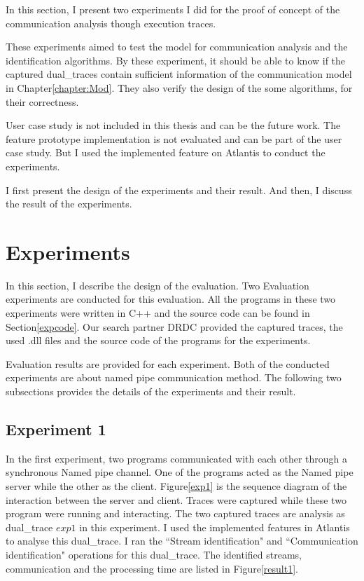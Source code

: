 


\label{chapter:Exp}
In this section, I present two experiments I did for the proof of concept of the communication analysis though execution traces.

These experiments aimed to test the model for communication analysis and the identification algorithms. By these experiment, it should be able to know if the captured dual\_traces contain sufficient information of the communication model in Chapter\ref{chapter:Mod}. They also verify the design of the some algorithms, for their correctness.  

User case study is not included in this thesis and can be the future work. The feature prototype implementation is not evaluated and can be part of the user case study. But I used the implemented feature on Atlantis to conduct the experiments.

I first present the design of the experiments and their result. And then, I discuss the result of the experiments.  

\section{Experiments}
In this section, I describe the design of the evaluation. Two Evaluation experiments are conducted for this evaluation. All the programs in these two experiments were written in C++ and the source code can be found in Section\ref{expcode}. Our search partner DRDC provided the captured traces, the used .dll files and  the source code of the programs for the experiments.

Evaluation results are provided for each experiment. Both of the conducted experiments are about named pipe communication method. The following two subsections provides the details of the experiments and their result.

\subsection{Experiment 1}
In the first experiment, two programs communicated with each other through a synchronous Named pipe channel. One of the programs acted as the Named pipe server while the other as the client. Figure\ref{exp1} is the sequence diagram of the interaction between the server and client. Traces were captured while these two program were running and interacting. The two captured traces are analysis as dual\_trace $exp1$ in this experiment. I used the implemented features in Atlantis to analyse this dual\_trace. I ran the ``Stream identification" and ``Communication identification" operations for this dual\_trace. The identified streams, communication and the processing time are listed in Figure\ref{result1}.

